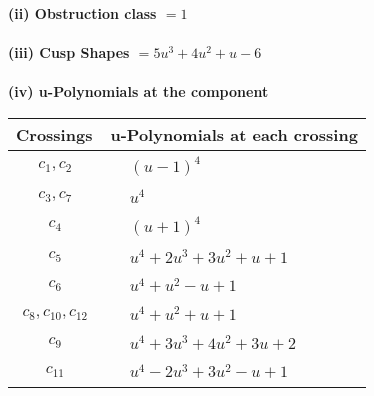 \documentclass[1p]{elsarticle_modified}
\theoremstyle{definition}
\begin{document}
\flushleft \textbf{(ii) Obstruction class $= 1$}\\~\\
\flushleft \textbf{(iii) Cusp Shapes $= 5 u^3+4 u^2+u-6$}\\~\\
\newpage\renewcommand{\arraystretch}{1}
\flushleft \textbf{(iv) u-Polynomials at the component}\newline \\
\begin{tabular}{m{50pt}|m{274pt}}
Crossings & \hspace{64pt}u-Polynomials at each crossing \\
\hline $$\begin{aligned}c_{1},c_{2}\end{aligned}$$&$\begin{aligned}
&(u-1)^4
\end{aligned}$\\
\hline $$\begin{aligned}c_{3},c_{7}\end{aligned}$$&$\begin{aligned}
&u^4
\end{aligned}$\\
\hline $$\begin{aligned}c_{4}\end{aligned}$$&$\begin{aligned}
&(u+1)^4
\end{aligned}$\\
\hline $$\begin{aligned}c_{5}\end{aligned}$$&$\begin{aligned}
&u^4+2 u^3+3 u^2+u+1
\end{aligned}$\\
\hline $$\begin{aligned}c_{6}\end{aligned}$$&$\begin{aligned}
&u^4+u^2- u+1
\end{aligned}$\\
\hline $$\begin{aligned}c_{8},c_{10},c_{12}\end{aligned}$$&$\begin{aligned}
&u^4+u^2+u+1
\end{aligned}$\\
\hline $$\begin{aligned}c_{9}\end{aligned}$$&$\begin{aligned}
&u^4+3 u^3+4 u^2+3 u+2
\end{aligned}$\\
\hline $$\begin{aligned}c_{11}\end{aligned}$$&$\begin{aligned}
&u^4-2 u^3+3 u^2- u+1
\end{aligned}$\\
\hline
\end{tabular}\\~\\
\end{document}
